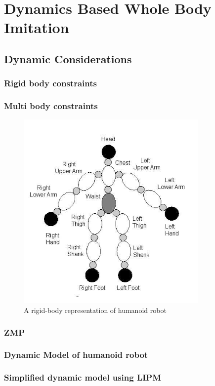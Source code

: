 \chapter{Dynamics Based Whole Body Imitation}
\label{chapter-3}

\section{Dynamic Considerations}
\label{dynamic-consideration}
\subsection{Rigid body constraints}
\subsection{Multi body constraints}

\begin{figure}[h!]
    \centering
    \includegraphics[scale=0.175]{images/humanoid-rigid-bodies.png}\hfill
    \caption{A rigid-body representation of humanoid robot}\hfill
    \label{humanoid-rigid-body}
\end{figure}

\subsection{ZMP}
\subsection{Dynamic Model of humanoid robot}
\subsection{Simplified dynamic model using LIPM}

